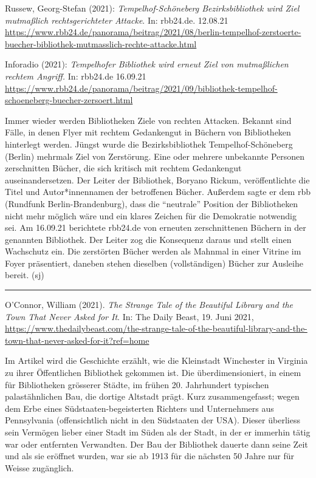 \documentclass[a4paper,
fontsize=11pt,
oneside,
numbers=noperiodatend,
parskip=half-,
bibliography=totoc,
final
]{scrartcl}
\begin{document}
Russew, Georg-Stefan (2021): \emph{Tempelhof-Schöneberg
Bezirksbibliothek wird Ziel mutmaßlich rechtsgerichteter Attacke}. In:
rbb24.de. 12.08.21
\url{https://www.rbb24.de/panorama/beitrag/2021/08/berlin-tempelhof-zerstoerte-buecher-bibliothek-mutmasslich-rechte-attacke.html}

Inforadio (2021): \emph{Tempelhofer Bibliothek wird erneut Ziel von
mutmaßlichen rechtem Angriff.} In: rbb24.de 16.09.21
\url{https://www.rbb24.de/panorama/beitrag/2021/09/bibliothek-tempelhof-schoeneberg-buecher-zersoert.html}

Immer wieder werden Bibliotheken Ziele von rechten Attacken. Bekannt
sind Fälle, in denen Flyer mit rechtem Gedankengut in Büchern von
Bibliotheken hinterlegt werden. Jüngst wurde die Bezirksbibliothek
Tempelhof-Schöneberg (Berlin) mehrmals Ziel von Zerstörung. Eine oder
mehrere unbekannte Personen zerschnitten Bücher, die sich kritisch mit
rechtem Gedankengut auseinandersetzen. Der Leiter der Bibliothek,
Boryano Rickum, veröffentlichte die Titel und Autor*innennamen der
betroffenen Bücher. Außerdem sagte er dem rbb (Rundfunk
Berlin-Brandenburg), dass die \enquote{neutrale} Position der Bibliotheken
nicht mehr möglich wäre und ein klares Zeichen für die Demokratie
notwendig sei. Am 16.09.21 berichtete rbb24.de von erneuten
zerschnittenen Büchern in der genannten Bibliothek. Der Leiter zog die
Konsequenz daraus und stellt einen Wachschutz ein. Die zerstörten Bücher
werden als Mahnmal in einer Vitrine im Foyer präsentiert, daneben stehen
dieselben (vollständigen) Bücher zur Ausleihe bereit. (sj)

\begin{center}\rule{0.5\linewidth}{0.5pt}\end{center}

O'Connor, William (2021). \emph{The Strange Tale of the Beautiful
Library and the Town That Never Asked for It}. In: The Daily Beast, 19.
Juni 2021,
\url{https://www.thedailybeast.com/the-strange-tale-of-the-beautiful-library-and-the-town-that-never-asked-for-it?ref=home}

Im Artikel wird die Geschichte erzählt, wie die Kleinstadt Winchester in
Virginia zu ihrer Öffentlichen Bibliothek gekommen ist. Die
überdimensioniert, in einem für Bibliotheken grösserer Städte, im frühen
20. Jahrhundert typischen palastähnlichen Bau, die dortige Altstadt
prägt. Kurz zusammengefasst; wegen dem Erbe eines
Südstaaten-begeisterten Richters und Unternehmers aus Pennsylvania
(offensichtlich nicht in den Südstaaten der USA). Dieser überliess sein
Vermögen lieber einer Stadt im Süden als der Stadt, in der er immerhin
tätig war oder entfernten Verwandten. Der Bau der Bibliothek dauerte
dann seine Zeit und als sie eröffnet wurden, war sie ab 1913 für die
nächsten 50 Jahre nur für Weisse zugänglich.
\end{document}
